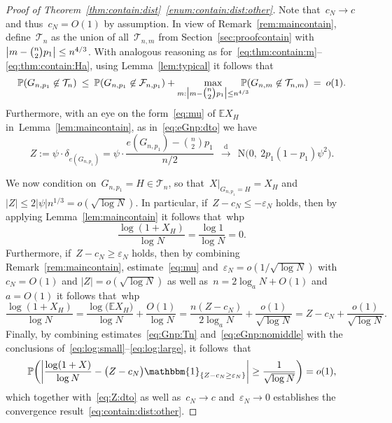 \documentclass{article}
\newcommand{\eps}{\varepsilon}
\renewcommand{\Pr}{\mathbb{P}}
\newcommand{\E}{\mathbb{E}}
\newcommand{\cF}{\mathcal{F}}
\newcommand{\cT}{\mathcal{T}}
\newcommand\bigpar[1]{\bigl(#1\bigr)}
\newcommand\biggpar[1]{\biggl(#1\biggr)}
\newcommand\bigabs[1]{\bigl|#1\bigr|}
\newcommand\biggabs[1]{\biggl|#1\biggr|}
\newcommand{\indic}[1]{\mathbbm{1}_{\{{#1}\}}}
\newcommand{\refT}[1]{Theorem~\ref{#1}}
\newcommand{\refL}[1]{Lemma~\ref{#1}}
\newcommand{\refR}[1]{Remark~\ref{#1}}
\newcommand{\refS}[1]{Section~\ref{#1}}
\newcommand\dto{\overset{\mathrm{d}}{\to}}
\newcommand\Nor{\mathrm{N}}
\begin{document}
\begin{proof}[Proof of \refT{thm:contain:dist}~\ref{enum:contain:dist:other}]
Note that~$c_N \to c$ and thus~$c_N = O(1)$ by assumption. 
In view of \refR{rem:maincontain}, define~$\cT_n$ as the union of all~$\cT_{n,m}$ from \refS{sec:proofcontain} with~$\bigabs{m-\tbinom{n}{2}p_1} \le n^{4/3}$. 
With analogous reasoning as for~\eqref{eq:thm:contain:m}--\eqref{eq:thm:contain:Ha}, 
using \refL{lem:typical} it follows that 
 \begin{equation}\label{eq:Gnp:Tn}
\Pr(G_{n,p_1} \not\in \cT_n) \: \le \: \Pr(G_{n,p_1} \not\in \cF_{n,p_1}) + \max_{m:\bigabs{m-\tbinom{n}{2}p_1} \le n^{4/3}}\!\!\!\!\!\!\Pr(G_{n,m} \not\in \cT_{n,m}) \: = \: o(1) .
\end{equation}
Furthermore, with an eye on the form~\eqref{eq:mu} of $\E X_H$ in~\refL{lem:maincontain}, 
as in~\eqref{eq:eGnp:dto} we have 
 \begin{equation}\label{eq:Z:dto}
Z := \psi \cdot \delta_{e(G_{n,p_1})} =\psi \cdot  \frac{e(G_{n,p_1})-\binom{n}{2}p_1}{n/2}  \:\: \dto \:\: \Nor\bigpar{0, \: 2p_1(1-p_1)\psi^2} .
\end{equation}

We now condition on~$G_{n,p_1} = H \in \cT_n$, so that~$X|_{G_{n,p_1}=H}=X_H$ and~$|Z| \le 2|\psi| n^{1/3} = o (\sqrt{\log N})$.
In particular, if~${Z-c_N \le -\eps_N}$ holds, then by applying  \refL{lem:maincontain} it follows that~whp
\begin{equation}\label{eq:log:small}
\frac{\log(1+X_H)}{\log N} = \frac{\log 1}{\log N} = 0. 
\end{equation}
Furthermore, if~${Z -c_N\ge \eps_N}$ holds, then by combining \refR{rem:maincontain}, estimate~\eqref{eq:mu} and~$\eps_N = o(1/\sqrt{\log N})$ with~${c_N=O(1)}$ and ${|Z| = o (\sqrt{\log N})}$ as well as~${n = 2 \log_a N + O(1)}$ and~${a=O(1)}$ it  follows that~whp
\begin{equation}\label{eq:log:large}
\frac{\log(1+X_H)}{\log N} = 
\frac{\log\bigpar{\E X_H}}{\log N} + \frac{O(1)}{\log N} =
\frac{n(Z-c_N)}{2\log_a N} + \frac{o(1)}{\sqrt{\log N}}
= Z-c_N + \frac{o(1)}{\sqrt{\log N}}.
\end{equation}
Finally, by combining estimates~\eqref{eq:Gnp:Tn} and~\eqref{eq:eGnp:nomiddle} with the conclusions of~\eqref{eq:log:small}--\eqref{eq:log:large},  
it follows~that 
\begin{equation*}\label{eq:log:approx}
\Pr\biggpar{\biggabs{\frac{\log(1+X)}{\log N}-\bigpar{Z-c_N}\indic{Z -c_N\ge \eps_N} } \ge \frac{1}{\sqrt{\log N}}} = o(1),
\end{equation*}
which together with~\eqref{eq:Z:dto} as well as~$c_N \to c$ and~$\eps_N \to 0$ establishes the convergence result~\eqref{eq:contain:dist:other}. 
\end{proof}
\end{document}
